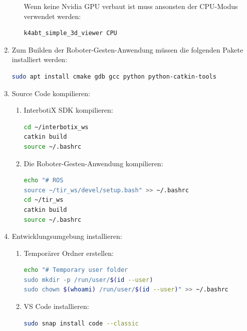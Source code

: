 \begin{enumerate}[label*=\arabic*.]
\begin{enumerate}[label*=\arabic*.]
                Wenn keine Nvidia GPU verbaut ist muss ansonsten der CPU-Modus verwendet werden:
                \begin{lstlisting}[language=bash]
k4abt_simple_3d_viewer CPU
                \end{lstlisting}
        \end{enumerate}

    \item Zum Builden der Roboter-Gesten-Anwendung müssen die folgenden Pakete installiert werden:
        \begin{lstlisting}[language=bash]
sudo apt install cmake gdb gcc python python-catkin-tools
        \end{lstlisting}

    \item Source Code kompilieren:
        \begin{enumerate}[label*=\arabic*.]
            \item InterbotiX SDK kompilieren:
                \begin{lstlisting}[language=bash]
cd ~/interbotix_ws
catkin build
source ~/.bashrc
                \end{lstlisting}

            \item Die Roboter-Gesten-Anwendung kompilieren:
                \begin{lstlisting}[language=bash]
echo "# ROS
source ~/tir_ws/devel/setup.bash" >> ~/.bashrc
cd ~/tir_ws
catkin build
source ~/.bashrc
                \end{lstlisting}
        \end{enumerate}

    \item Entwicklungsumgebung installieren:
        \begin{enumerate}[label*=\arabic*.]
            \item Temporärer Ordner erstellen:
                \begin{lstlisting}[language=bash]
echo "# Temporary user folder
sudo mkdir -p /run/user/$(id --user)
sudo chown $(whoami) /run/user/$(id --user)" >> ~/.bashrc
                \end{lstlisting}

            \item VS Code installieren:
                \begin{lstlisting}[language=bash]
sudo snap install code --classic
                \end{lstlisting}


\end{enumerate}
\end{enumerate}
